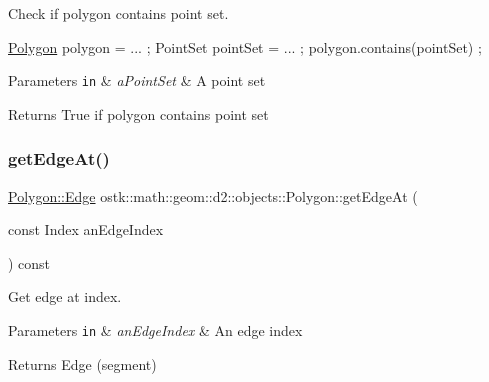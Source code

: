 Check if polygon contains point set. 


\begin{DoxyCode}
\hyperlink{classostk_1_1math_1_1geom_1_1d2_1_1objects_1_1_polygon_adaf9ef564754ab10ed3dd0d5fa0d90ea}{Polygon} polygon = ... ;
PointSet pointSet = ... ;
polygon.contains(pointSet) ;
\end{DoxyCode}



\begin{DoxyParams}[1]{Parameters}
\mbox{\tt in}  & {\em a\+Point\+Set} & A point set \\
\hline
\end{DoxyParams}
\begin{DoxyReturn}{Returns}
True if polygon contains point set 
\end{DoxyReturn}
\mbox{\label{classostk_1_1math_1_1geom_1_1d2_1_1objects_1_1_polygon_a247cba455e33ab1a05c43de43c27ba48}} 
\subsubsection{\texorpdfstring{get\+Edge\+At()}{getEdgeAt()}}
{\footnotesize\ttfamily \hyperlink{classostk_1_1math_1_1geom_1_1d2_1_1objects_1_1_polygon_a85e5c92944c126a62464874b5a6ba490}{Polygon\+::\+Edge} ostk\+::math\+::geom\+::d2\+::objects\+::\+Polygon\+::get\+Edge\+At (\begin{DoxyParamCaption}\item[{const Index}]{an\+Edge\+Index }\end{DoxyParamCaption}) const}



Get edge at index. 


\begin{DoxyParams}[1]{Parameters}
\mbox{\tt in}  & {\em an\+Edge\+Index} & An edge index \\
\hline
\end{DoxyParams}
\begin{DoxyReturn}{Returns}
Edge (segment) 
\end{DoxyReturn}
\mbox{\label{classostk_1_1math_1_1geom_1_1d2_1_1objects_1_1_polygon_a585310d630d1e80f496a9525a308bb2b}} 
